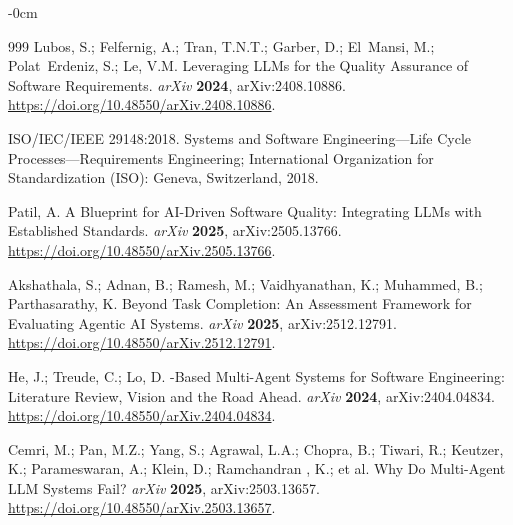 \documentclass[software,article,accept,pdftex,oneauthor]{Definitions/mdpi}
\def\hl#1{#1}
\begin{document}
\begin{adjustwidth}{-\extralength}{0cm}
\begin{thebibliography}{999}
Lubos, S.; Felfernig, A.; Tran, T.N.T.; Garber, D.; El~Mansi, M.;
  Polat~Erdeniz, S.; Le, V.M.
\newblock Leveraging {LLMs} for the Quality Assurance of Software Requirements. \emph{arXiv} \textbf{2024},  	arXiv:2408.10886. \url{https://doi.org/10.48550/arXiv.2408.10886}\hl{.} %


ISO/IEC/IEEE 29148:2018. Systems and Software Engineering---Life Cycle Processes---Requirements Engineering; International Organization for Standardization (ISO): Geneva, Switzerland, 2018.

Patil, A.
\newblock A Blueprint for {AI}-Driven Software Quality: Integrating {LLMs} with
  Established Standards. \emph{arXiv} \textbf{2025}, arXiv:2505.13766. \url{ 	
https://doi.org/10.48550/arXiv.2505.13766}.

Akshathala, S.; Adnan, B.; Ramesh, M.; Vaidhyanathan, K.; Muhammed, B.;
  Parthasarathy, K.
\newblock Beyond Task Completion: An Assessment Framework for Evaluating
  Agentic {AI} Systems.  \emph{arXiv} \textbf{2025},  arXiv:2512.12791. \url{ 	
https://doi.org/10.48550/arXiv.2512.12791}.

He, J.; Treude, C.; Lo, D.
-Based Multi-Agent Systems for Software Engineering: Literature
  Review, Vision and the Road Ahead.  \emph{arXiv} \textbf{2024},  arXiv:2404.04834. \url{ 	
https://doi.org/10.48550/arXiv.2404.04834}.

Cemri, M.; Pan, M.Z.; Yang, S.; Agrawal, L.A.; Chopra, B.; Tiwari, R.; Keutzer, K.; Parameswaran, A.; Klein, D.; Ramchandran , K.; et al. 
\newblock Why Do Multi-Agent {LLM} Systems Fail?  \emph{arXiv} \textbf{2025},  	arXiv:2503.13657. \url{ 	
https://doi.org/10.48550/arXiv.2503.13657}.


\end{thebibliography}
\end{adjustwidth}
\end{document}
